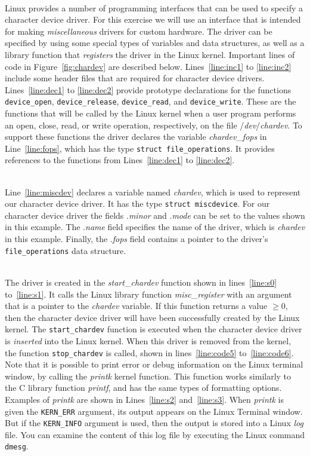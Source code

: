 \documentclass[epsfig,10pt,fullpage]{article}
\begin{document}
~\\
\noindent
Linux provides a number of programming interfaces that can be used to specify a character device
driver. For this exercise we will use an interface that is intended for making 
{\it miscellaneous} drivers for custom hardware. The driver can be specified by using some 
special types of variables and data structures, as well as a library function that 
{\it registers} the driver in the Linux kernel.  Important lines of code in
Figure~\ref{fig:chardev} are described below. Lines~\ref{line:inc1} to \ref{line:inc2} 
include some header files that are required for character device drivers.
Lines~\ref{line:dec1} to \ref{line:dec2} provide prototype declarations for the 
functions \texttt{device\_open}, \texttt{device\_release},
\texttt{device\_read}, and \texttt{device\_write}. These are the functions that will be 
called by the Linux kernel when a user program performs an open, close, read, or write 
operation, respectively, on the file /{\it dev}/{\it chardev}. To support these functions
the driver declares the variable {\it chardev}\_{\it fops} in Line~\ref{line:fops}, which 
has the type \texttt{struct file\_operations}. It provides references to the functions from 
Lines~\ref{line:dec1} to \ref{line:dec2}.

~\\
\noindent
Line~\ref{line:miscdev} declares a variable named {\it chardev}, which is used to
represent our character device driver. It has the type \texttt{struct miscdevice}. 
For our character device driver the fields .{\it minor} and .{\it mode} can be set 
to the values shown in this example. The .{\it name} field specifies the name of the driver,
which is {\it chardev} in this example. Finally, the .{\it fops} field contains a pointer
to the driver's \texttt{file\_operations} data structure.

~\\
\noindent
The driver is created in the {\it start}\_{\it chardev} function shown
in lines~\ref{line:s0} to~\ref{line:s1}. It calls the Linux library function 
{\it misc}\_{\it register} with an argument that is a pointer to the {\it chardev} variable. 
If this function returns a value $\geq 0$, then the character device driver will have been 
successfully created by the Linux kernel.
The \texttt{start\_chardev} function is executed when the character
device driver is {\it inserted} into the Linux kernel. When this driver is removed from the
kernel, the function \texttt{stop\_chardev} is called, shown in lines~\ref{line:code5}
to~\ref{line:code6}. Note that it is possible to print error or debug information on the 
Linux terminal window, by calling the {\it printk} kernel function. This function
works similarly to the C library function {\it printf}, and has the same types of formatting 
options. Examples of {\it printk} are shown in Lines~\ref{line:s2} and~\ref{line:s3}.
When {\it printk} is given the \texttt{KERN\_ERR} argument, its output appears on the
Linux Terminal window. But if the \texttt{KERN\_INFO} argument is used, then the output is
stored into a Linux {\it log} file. You can examine the content of this log file by executing the
Linux command \texttt{dmesg}.
\end{document}
